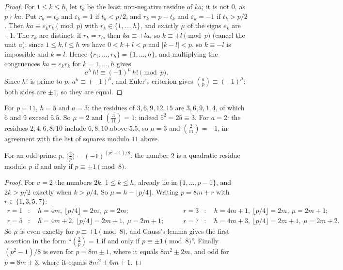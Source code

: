 \begin{proof}
For $1 \leq k \leq h$, let $t_k$ be the least non-negative residue of $ka$; it is not $0$, as $p \nmid ka$. Put $r_k = t_k$ and $\varepsilon_k = 1$ if $t_k < p/2$, and $r_k = p - t_k$ and $\varepsilon_k = -1$ if
$t_k > p/2$. Then $ka \equiv \varepsilon_kr_k \pmod p$ with $r_k \in \{1, \ldots, h\}$, and exactly $\mu$ of the signs $\varepsilon_k$ are $-1$. The $r_k$ are distinct: if $r_k = r_l$, then
$ka \equiv \pm la$, so $k \equiv \pm l \pmod p$ (cancel the unit $a$); since $1 \leq k, l \leq h$ we have $0 < k + l < p$ and $|k - l| < p$, so $k \equiv -l$ is impossible and $k = l$. Hence
$\{r_1, \ldots, r_h\} = \{1, \ldots, h\}$, and multiplying the congruences $ka \equiv \varepsilon_kr_k$ for $k = 1, \ldots, h$ gives
\[
a^h\,h! \equiv (-1)^\mu\,h! \pmod p .
\]
Since $h!$ is prime to $p$, $a^h \equiv (-1)^\mu$, and Euler's criterion gives $(\frac{a}{p}) \equiv (-1)^\mu$; both sides are $\pm1$, so they are equal.
\end{proof}

\begin{example}\label{number-theory:example-gauss-lemma}
For $p = 11$, $h = 5$ and $a = 3$: the residues of $3, 6, 9, 12, 15$ are $3, 6, 9, 1, 4$, of which $6$ and $9$ exceed $5.5$. So $\mu = 2$ and $(\frac{3}{11}) = 1$; indeed $5^2 = 25 \equiv 3$. For
$a = 2$: the residues $2, 4, 6, 8, 10$ include $6, 8, 10$ above $5.5$, so $\mu = 3$ and $(\frac{2}{11}) = -1$, in agreement with the list of squares modulo $11$ above.
\end{example}

\begin{proposition}\label{number-theory:proposition-two}
For an odd prime $p$, $\bigl(\frac{2}{p}\bigr) = (-1)^{(p^2-1)/8}$: the number $2$ is a quadratic residue modulo $p$ if and only if $p \equiv \pm1 \pmod 8$.
\end{proposition}

\begin{proof}
For $a = 2$ the numbers $2k$, $1 \leq k \leq h$, already lie in $\{1, \ldots, p - 1\}$, and $2k > p/2$ exactly when $k > p/4$. So $\mu = h - \lfloor p/4\rfloor$. Writing $p = 8m + r$ with
$r \in \{1, 3, 5, 7\}$:
\[
\begin{aligned}
r = 1 &: \quad h = 4m, \ \lfloor p/4\rfloor = 2m, \ \mu = 2m; \qquad & r = 3 &: \quad h = 4m + 1, \ \lfloor p/4\rfloor = 2m, \ \mu = 2m + 1; \\
r = 5 &: \quad h = 4m + 2, \ \lfloor p/4\rfloor = 2m + 1, \ \mu = 2m + 1; \qquad & r = 7 &: \quad h = 4m + 3, \ \lfloor p/4\rfloor = 2m + 1, \ \mu = 2m + 2.
\end{aligned}
\]
So $\mu$ is even exactly for $p \equiv \pm1 \pmod 8$, and Gauss's lemma gives the first assertion in the form ``$(\frac{2}{p}) = 1$ if and only if $p \equiv \pm1 \pmod 8$''. Finally $(p^2 - 1)/8$ is even for
$p = 8m \pm 1$, where it equals $8m^2 \pm 2m$, and odd for $p = 8m \pm 3$, where it equals $8m^2 \pm 6m + 1$.
\end{proof}

